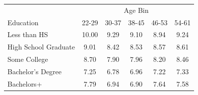 \begin{tabular}{lccccc}
\hline\hline
 & \multicolumn{5}{c}{Age Bin} \\
Education & 22-29 & 30-37 & 38-45 & 46-53 & 54-61 \\
\hline
Less than HS&10.00&9.29&9.10&8.94&9.24\\
High School Graduate&9.01&8.42&8.53&8.57&8.61\\
Some College&8.70&7.90&7.96&8.20&8.46\\
Bachelor's Degree&7.25&6.78&6.96&7.22&7.33\\
Bachelors+&7.79&6.94&6.90&7.64&7.58\\
\hline\hline
\end{tabular}
